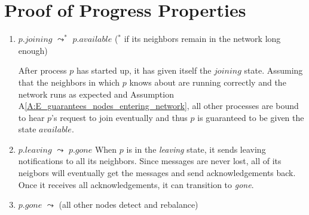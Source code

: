 \documentclass[11pt]{article}
\begin{document}
\section{Proof of Progress Properties}
\begin{enumerate}[PG1]
\item
$p.joining$ $\leadsto^*$ $p.available$ ($^*$ if its neighbors remain in the network long enough) 

\indent After process $p$ has started up, it has given itself the $joining$ state. Assuming that the neighbors in which $p$ knows about are running correctly and the network runs as expected and Assumption A\ref{A:E_guarantees_nodes_entering_network}, all other processes are bound to hear $p$'s request to join eventually and thus $p$ is guaranteed to be given the state $available$.

\item 
$p.leaving$ $\leadsto$ $p.gone$
When $p$ is in the \emph{leaving} state, it sends leaving notifications to all its neighbors. Since messages are never lost, all of its neigbors will eventually get the messages and send acknowledgements back. Once it receives all acknowledgements, it can transition to \emph{gone}.

\item 
$p.gone$ $\leadsto$ (all other nodes detect and rebalance)

\end{enumerate}

\end{document}
